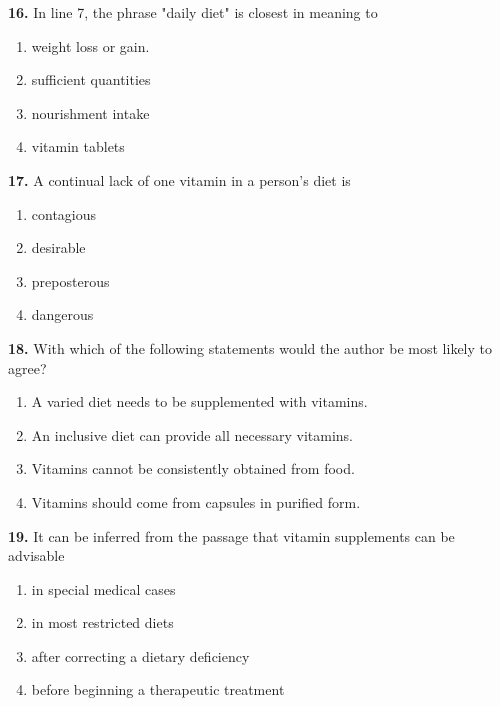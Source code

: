 \documentclass[12pt]{article}
\begin{document}
\par
\vspace{0.25\baselineskip}
\noindent\textbf{16.} In line 7, the phrase "daily diet" is closest in meaning to
\begin{enumerate}[label=(\Alph*),leftmargin=*,itemsep=0.2em]
\item weight loss or gain.
\item sufficient quantities
\item nourishment intake
\item vitamin tablets
\end{enumerate}
\par
\vspace{0.25\baselineskip}
\noindent\textbf{17.} A continual lack of one vitamin in a person's diet is
\begin{enumerate}[label=(\Alph*),leftmargin=*,itemsep=0.2em]
\item contagious
\item desirable
\item preposterous
\item dangerous
\end{enumerate}
\par
\vspace{0.25\baselineskip}
\noindent\textbf{18.} With which of the following statements would the author be most likely to agree?
\begin{enumerate}[label=(\Alph*),leftmargin=*,itemsep=0.2em]
\item A varied diet needs to be supplemented with vitamins.
\item An inclusive diet can provide all necessary vitamins.
\item Vitamins cannot be consistently obtained from food.
\item Vitamins should come from capsules in purified form.
\end{enumerate}
\par
\vspace{0.25\baselineskip}
\noindent\textbf{19.} It can be inferred from the passage that vitamin supplements can be advisable
\begin{enumerate}[label=(\Alph*),leftmargin=*,itemsep=0.2em]
\item in special medical cases
\item in most restricted diets
\item after correcting a dietary deficiency
\item before beginning a therapeutic treatment
\end{enumerate}
\end{document}

